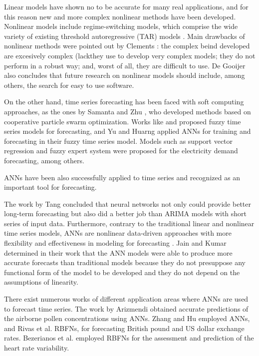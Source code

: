 \documentclass[preprint,authoryear,12pt]{elsarticle}
\begin{document}
Linear models have shown no to be accurate for many real applications, and for this reason new and more complex nonlinear methods have been developed. Nonlinear models include regime-switching models, which comprise the wide variety of existing threshold autoregressive (TAR) models \cite{Tong1978}. Main drawbacks of nonlinear methods were pointed out by Clements \cite{Clements2004}: the complex beind developed are excesively complex (lackthey use to develop very complex models; they do not perform in a robust way; and, worst of all, they are difficult to use. De Gooijer \cite{Gooijer25years} also concludes that future research on nonlinear models should include, among others, the search for easy to use software.


On the other hand, time series forecasting has been faced with soft computing approaches, as the ones by Samanta \cite{Samanta2011} and Zhu \cite{Zhu2011}, who developed methods based on cooperative particle swarm optimization. Works like \cite{Qiu2011} and \cite{Wang2011} proposed fuzzy time series models for forecasting, and Yu and Huarng \cite{Yu2010} applied ANNs for training and forecasting in their fuzzy time series model. Models such as support vector regression \cite{Kavaklioglu2011} and fuzzy expert system \cite{Dash1995} were proposed for the electricity demand forecasting, among others.

ANNs have been also successfully applied to time series and recognized as an important tool for forecasting. 

The work by Tang \cite{Tang1991} concluded that neural networks not only could provide better long-term forecasting but also did a better job than ARIMA models with short series of input data. Furthermore, contrary to the traditional linear and nonlinear time series models, ANNs are nonlinear data-driven approaches with more flexibility and effectiveness in modeling for forecasting \cite{Zhang1998b}. Jain and Kumar determined in their work \cite{Jain2007} that the ANN models were able to produce more accurate forecasts than traditional models because they do not presuppose any functional form of the model to be developed and they do not depend on the assumptions of linearity.

There exist numerous works of different application areas where ANNs are used to forecast time series. The work by Arizmendi \cite{Arizmendi1993} obtained accurate predictions of the airborne pollen concentrations using ANNs. Zhang and Hu \cite{Zhang1998b} employed ANNs, and Rivas et al. \cite{Rivas04} RBFNs, for forecasting British pound and US dollar exchange rates. Bezerianos et al. \cite{Bezerianos1999} employed RBFNs for the assessment and prediction of the heart rate variability. 
\end{document}
